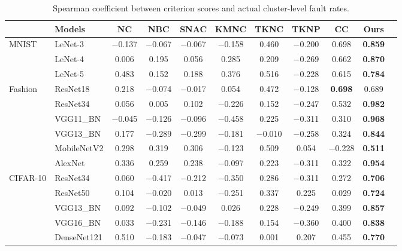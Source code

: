 \documentclass[preprint,number,5p,twocolumn]{elsarticle}
\begin{document}
\begin{table}[htbp]
  \centering
  \caption{Spearman coefficient between criterion scores and actual cluster-level fault rates.} \label{tab:spearman}
  \scriptsize
  \begin{tabular}{l|lccccccccc}
    \toprule
    & \textbf{Models} & \textbf{NC} & \textbf{NBC} & \textbf{SNAC} & \textbf{KMNC} & \textbf{TKNC} & \textbf{TKNP} & \textbf{CC} & \textbf{Ours} \\
    \midrule
    \multirow{3}{*}{MNIST}
      & LeNet-3    & $-$0.137 & $-$0.067 & $-$0.067 & $-$0.158 & 0.460 & $-$0.200 & 0.698 & \textbf{0.859} \\
      & LeNet-4    & 0.006 & 0.195 & 0.056 & 0.285 & 0.209 & $-$0.269 & 0.662 & \textbf{0.870} \\
      & LeNet-5    & 0.483 & 0.152 & 0.188 & 0.376 & 0.516 & $-$0.228 & 0.615 & \textbf{0.784} \\
    \midrule
    \multirow{6}{*}{Fashion}
      & ResNet18    & 0.218 & $-$0.074 & $-$0.017 & 0.054 & 0.472 & $-$0.128 & \textbf{0.698} & 0.689 \\
      & ResNet34    & 0.056 & 0.005 & 0.102 & $-$0.226 & 0.152 & $-$0.247 & 0.532 & \textbf{0.982} \\
      & VGG11\_BN   & $-$0.045 & $-$0.126 & $-$0.096 & $-$0.458 & 0.225 & $-$0.311 & 0.310 & \textbf{0.968} \\
      & VGG13\_BN   & 0.177 & $-$0.289 & $-$0.299 & $-$0.181 & $-$0.010 & $-$0.258 & 0.324 & \textbf{0.844} \\
      & MobileNetV2 & 0.298 & 0.319 & 0.306 & $-$0.123 & 0.509 & 0.054 & $-$0.228 & \textbf{0.511} \\
      & AlexNet     & 0.336 & 0.259 & 0.238 & $-$0.097 & 0.223 & $-$0.311 & 0.322 & \textbf{0.954} \\
    \midrule
    \multirow{6}{*}{CIFAR-10}
      & ResNet34    & 0.060 & $-$0.417 & $-$0.212 & $-$0.350 & 0.286 & $-$0.311 & 0.272 & \textbf{0.706} \\
      & ResNet50    & 0.104 & $-$0.020 & 0.013 & $-$0.251 & 0.337 & 0.225 & 0.029 & \textbf{0.724} \\
      & VGG13\_BN   & 0.092 & $-$0.102 & $-$0.049 & 0.026 & 0.228 & $-$0.249 & 0.399 & \textbf{0.857} \\
      & VGG16\_BN   & 0.033 & $-$0.231 & $-$0.146 & $-$0.188 & 0.154 & $-$0.360 & 0.400 & \textbf{0.838} \\
      & DenseNet121 & 0.510 & $-$0.183 & $-$0.047 & $-$0.073 & 0.001 & 0.207 & 0.455 & \textbf{0.770} \\

\end{tabular}
\end{table}
\end{document}
